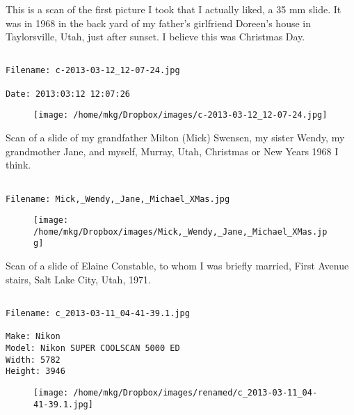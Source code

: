 
\clearpage
\onecolumn
\noindent This is a scan of the first picture I took that I actually liked, a 35 mm slide. It was in 1968 in the back yard of my father's girlfriend Doreen's house in Taylorsville, Utah, just after sunset. I believe this was Christmas Day.
\noindent
\begin{lstlisting}

Filename: c-2013-03-12_12-07-24.jpg

Date: 2013:03:12 12:07:26
\end{lstlisting}
\clearpage

\begin{figure}
\texttt{[image: /home/mkg/Dropbox/images/c-2013-03-12\_12-07-24.jpg]}
\end{figure}
    
\clearpage
\onecolumn
\noindent Scan of a slide of my grandfather Milton (Mick) Swensen, my sister Wendy, my grandmother Jane, and myself, Murray, Utah, Christmas or New Years 1968 I think.
\noindent
\begin{lstlisting}

Filename: Mick,_Wendy,_Jane,_Michael_XMas.jpg

\end{lstlisting}
\clearpage

\begin{figure}
\texttt{[image: /home/mkg/Dropbox/images/Mick,\_Wendy,\_Jane,\_Michael\_XMas.jpg]}
\end{figure}
    
\clearpage
\onecolumn
\noindent Scan of a slide of Elaine Constable, to whom I was briefly married, First Avenue stairs, Salt Lake City, Utah, 1971.
\noindent
\begin{lstlisting}

Filename: c_2013-03-11_04-41-39.1.jpg

Make: Nikon
Model: Nikon SUPER COOLSCAN 5000 ED
Width: 5782
Height: 3946
\end{lstlisting}
\clearpage

\begin{figure}
\texttt{[image: /home/mkg/Dropbox/images/renamed/c\_2013-03-11\_04-41-39.1.jpg]}
\end{figure}
    
